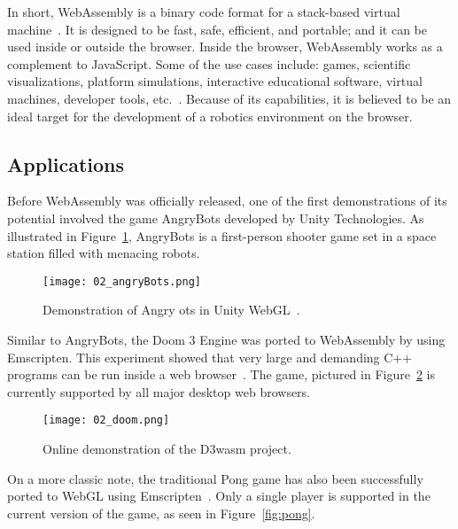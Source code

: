     In short, WebAssembly is a binary code format for a stack-based virtual machine~\cite{wasmspec}. It is designed to be fast, safe, efficient, and portable; and it can be used inside or outside the browser. Inside the browser, WebAssembly works as a complement to JavaScript. Some of the use cases include: games, scientific visualizations, platform simulations, interactive educational software, virtual machines, developer tools, etc.~\cite{wasmdocs}. Because of its capabilities, it is believed to be an ideal target for the development of a robotics environment on the browser.

        


    \subsection{Applications}

        Before WebAssembly was officially released, one of the first demonstrations of its potential involved the game AngryBots developed by Unity Technologies. As illustrated in Figure~\ref{fig:unity}, AngryBots is a first-person shooter game set in a space station filled with menacing robots.

        \begin{figure}[htbp]
            \centering
            \texttt{[image: 02\_angryBots.png]}
            \caption{Demonstration of Angry ots in Unity WebGL~\cite{angrybots}.}\label{fig:unity}
        \end{figure}

        Similar to AngryBots, the Doom 3 Engine was ported to WebAssembly by using Emscripten. This experiment showed that very large and demanding C++ programs can be run inside a web browser~\cite{doom3}. The game, pictured in Figure~\ref{fig:doom} is currently supported by all major desktop web browsers.

        \begin{figure}[htbp]
            \centering
            \texttt{[image: 02\_doom.png]}
            \caption{Online demonstration of the \ac{D3wasm} project.}
            \label{fig:doom}
        \end{figure}

        On a more classic note, the traditional Pong game has also been successfully ported to WebGL using Emscripten~\cite{pong}. Only a single player is supported in the current version of the game, as seen in Figure~\ref{fig:pong}. 

